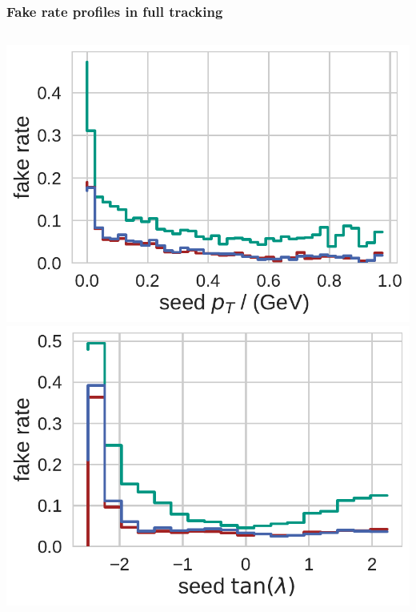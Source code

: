 \documentclass[18pt, aspectratio=169]{beamer}
\begin{document}
\begin{frame}
  \frametitle{Fake rate profiles in full tracking}
  \begin{columns}
      \begin{column}{.5\textwidth}
      \centering
      \includegraphics[width=.55\textwidth]{figures/fake_rate_by_pt_truth_fullreco.pdf}\\
      \includegraphics[width=.55\textwidth]{figures/fake_rate_by_tan_lambda_truth_fullreco.pdf}
    \end{column}


\end{columns}
\end{frame}
\end{document}
